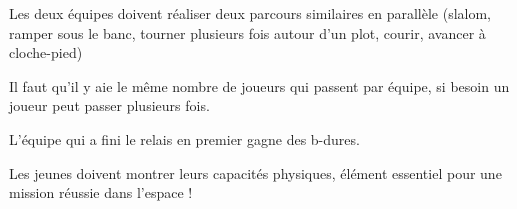 \documentclass{grand-jeu}
\begin{document}
\begin{liste-materiel}
\end{liste-materiel}

\begin{regles}
Les deux équipes doivent réaliser deux parcours similaires en parallèle (slalom, ramper sous le banc, tourner plusieurs fois autour d'un plot, courir, avancer à cloche-pied)

Il faut qu'il y aie le même nombre de joueurs qui passent par équipe, si besoin un joueur peut passer plusieurs fois.

L'équipe qui a fini le relais en premier gagne des b-dures. 
\end{regles}

\begin{imaginaire}
Les jeunes doivent montrer leurs capacités physiques, élément essentiel pour une mission réussie dans l'espace ! 
\end{imaginaire}

\begin{moments-stop}
\end{moments-stop}
\end{document}
